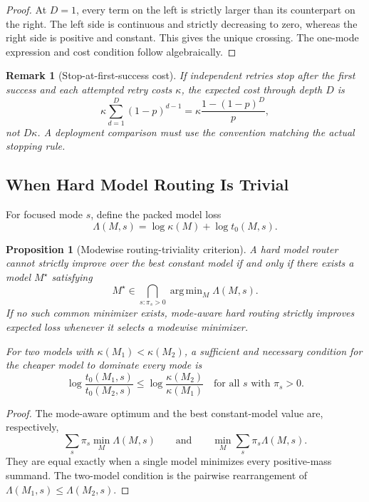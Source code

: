 \documentclass[10pt]{article}
\DeclareMathOperator*{\argmin}{arg\,min}
\theoremstyle{paperplain}
\newtheorem{proposition}[theorem]{Proposition}
\theoremstyle{paperdefinition}
\theoremstyle{paperremark}
\newtheorem{remark}[theorem]{Remark}
\begin{document}
\begin{proof}
At \(D=1\), every term on the left is strictly larger than its counterpart
on the right.  The left side is continuous and strictly decreasing to zero,
whereas the right side is positive and constant.  This gives the unique
crossing.  The one-mode expression and cost condition follow algebraically.
\end{proof}

\begin{remark}[Stop-at-first-success cost]
\label{rem:stop-at-first-success-cost}
If independent retries stop after the first success and each attempted retry
costs \(\kappa\), the expected cost through depth \(D\) is
\[
  \kappa\sum_{d=1}^{D}(1-p)^{d-1}
  =
  \kappa\frac{1-(1-p)^D}{p},
\]
not \(D\kappa\).  A deployment comparison must use the convention matching
the actual stopping rule.
\end{remark}

\subsection{When Hard Model Routing Is Trivial}

For focused mode \(s\), define the packed model loss
\[
  \Lambda(M,s)=\log\kappa(M)+\log t_0(M,s).
\]

\begin{proposition}[Modewise routing-triviality criterion]
\label{prop:routing-triviality-consolidated}
A hard model router cannot strictly improve over the best constant model if
and only if there exists a model \(M^\star\) satisfying
\[
  M^\star\in\bigcap_{s:\pi_s>0}\argmin_M\Lambda(M,s).
\]
If no such common minimizer exists, mode-aware hard routing strictly improves
expected loss whenever it selects a modewise minimizer.

For two models with \(\kappa(M_1)<\kappa(M_2)\), a sufficient and necessary
condition for the cheaper model to dominate every mode is
\[
  \log\frac{t_0(M_1,s)}{t_0(M_2,s)}
  \le
  \log\frac{\kappa(M_2)}{\kappa(M_1)}
  \quad\text{for all }s\text{ with }\pi_s>0.
\]
\end{proposition}

\begin{proof}
The mode-aware optimum and the best constant-model value are, respectively,
\[
  \sum_s\pi_s\min_M\Lambda(M,s)
  \qquad\text{and}\qquad
  \min_M\sum_s\pi_s\Lambda(M,s).
\]
They are equal exactly when a single model minimizes
every positive-mass summand.  The two-model condition is the pairwise
rearrangement of
\(\Lambda(M_1,s)\le\Lambda(M_2,s)\).
\end{proof}
\end{document}
